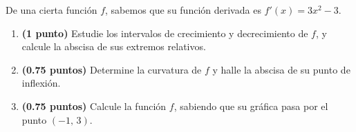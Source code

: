 
De una cierta función \(f\), sabemos que su función derivada es \(f'(x)=3x^2-3\).
\begin{enumerate}[label=\alph*),leftmargin=2.4em]
  \item \textbf{(1 punto)} Estudie los intervalos de crecimiento y decrecimiento de \(f\), y calcule la abscisa de sus extremos relativos.
  \item \textbf{(0.75 puntos)} Determine la curvatura de \(f\) y halle la abscisa de su punto de inflexión.
  \item \textbf{(0.75 puntos)} Calcule la función \(f\), sabiendo que su gráfica pasa por el punto \((-1,\,3)\).
\end{enumerate}
